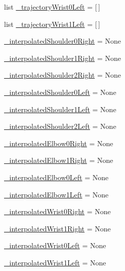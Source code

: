 \begin{DoxyCompactItemize}
\item 
list \mbox{\hyperlink{namespacesteering__interpolate__and__print_ab83e0147529c65da5d2ba923ddfb2ec6}{\+\_\+trajectory\+Wrist0\+Left}} = \mbox{[}$\,$\mbox{]}
\item 
list \mbox{\hyperlink{namespacesteering__interpolate__and__print_ad7ad31a7bd5fdf9075bbad3b6b2072b5}{\+\_\+trajectory\+Wrist1\+Left}} = \mbox{[}$\,$\mbox{]}
\item 
\mbox{\hyperlink{namespacesteering__interpolate__and__print_a641411862c0157a92c206b5e1237a2ca}{\+\_\+interpolated\+Shoulder0\+Right}} = None
\item 
\mbox{\hyperlink{namespacesteering__interpolate__and__print_a4162a9a09e78fa5a533e6ecde4ac359b}{\+\_\+interpolated\+Shoulder1\+Right}} = None
\item 
\mbox{\hyperlink{namespacesteering__interpolate__and__print_adb5a1d8781583c11cc05c5a94f07421d}{\+\_\+interpolated\+Shoulder2\+Right}} = None
\item 
\mbox{\hyperlink{namespacesteering__interpolate__and__print_abab620eada01ccb1ec063c8419506bac}{\+\_\+interpolated\+Shoulder0\+Left}} = None
\item 
\mbox{\hyperlink{namespacesteering__interpolate__and__print_a44af10859660101094ab8fe6ba378262}{\+\_\+interpolated\+Shoulder1\+Left}} = None
\item 
\mbox{\hyperlink{namespacesteering__interpolate__and__print_a1d53ff73e67722f5b6f98a7f74f3f1ce}{\+\_\+interpolated\+Shoulder2\+Left}} = None
\item 
\mbox{\hyperlink{namespacesteering__interpolate__and__print_a662b8bcfba342c150cec7500a5bc3791}{\+\_\+interpolated\+Elbow0\+Right}} = None
\item 
\mbox{\hyperlink{namespacesteering__interpolate__and__print_a2db12b0dbd7dd5e1bdc47a4263447582}{\+\_\+interpolated\+Elbow1\+Right}} = None
\item 
\mbox{\hyperlink{namespacesteering__interpolate__and__print_a523a7087a95e5bc05c35455b293f7efb}{\+\_\+interpolated\+Elbow0\+Left}} = None
\item 
\mbox{\hyperlink{namespacesteering__interpolate__and__print_a0b977d6359e07ea1bd5512c94996e10e}{\+\_\+interpolated\+Elbow1\+Left}} = None
\item 
\mbox{\hyperlink{namespacesteering__interpolate__and__print_a869de79e6b452cd9c27a7ee2f1f23cda}{\+\_\+interpolated\+Wrist0\+Right}} = None
\item 
\mbox{\hyperlink{namespacesteering__interpolate__and__print_adac5cf1903638f10ce4024d04f973d1e}{\+\_\+interpolated\+Wrist1\+Right}} = None
\item 
\mbox{\hyperlink{namespacesteering__interpolate__and__print_a8508089fb2512d27092487fb2535b33f}{\+\_\+interpolated\+Wrist0\+Left}} = None
\item 
\mbox{\hyperlink{namespacesteering__interpolate__and__print_ab3cde8f7dd244e7c93047fa581fbdc88}{\+\_\+interpolated\+Wrist1\+Left}} = None
\end{DoxyCompactItemize}


